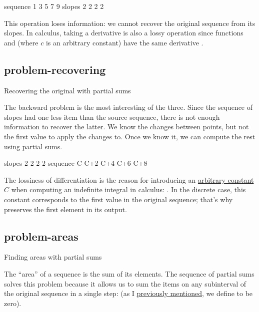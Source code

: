 \documentclass{article}
\begin{document}
\begin{code}
sequence  1  3  5  7  9
  slopes  2  2  2  2
\end{code}

This operation loses information:
we cannot recover the original sequence from its slopes.
In calculus, taking a derivative is also a lossy operation since functions
and
(where $c$ is an arbitrary constant) have the same derivative
.

\subsection{problem-recovering}{Recovering the original with partial sums}

The backward problem is the most interesting of the three.
Since the sequence of slopes had one less item than the source sequence,
there is not enough information to recover the latter.
We know the changes between points,
but not the first value to apply the changes to.
Once we know it, we can compute the rest using partial sums.

\begin{code}
  slopes       2    2    2    2
sequence  C  C+2  C+4  C+6  C+8
\end{code}

The lossiness of differentiation is the reason for introducing an \href{https://en.wikipedia.org/wiki/Constant_of_integration}{arbitrary constant} $C$
when computing an indefinite integral in calculus:
.
In the discrete case, this constant corresponds to the first value in the original sequence;
that's why  preserves the first element in its output.

\subsection{problem-areas}{Finding areas with partial sums}

The ``area'' of a sequence is the sum of its elements.
The sequence of partial sums solves this problem
because it allows us to sum the items on any subinterval of the original sequence in a single step:
(as I \href{#off-by-one}{previously mentioned}, we define
to be zero).
\end{document}

